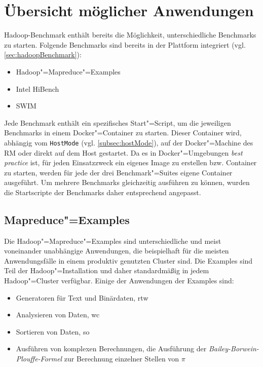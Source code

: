 \section{Übersicht möglicher Anwendungen}
\label{sec:appOverview}

Hadoop-Benchmark enthält bereits die Möglichkeit, unterschiedliche Benchmarks zu starten.
Folgende Benchmarks sind bereits in der Plattform integriert (vgl. \cref{sec:hadoopBenchmark}):

\begin{itemize}
    \item Hadoop"=Mapreduce"=Examples
    \item Intel HiBench
    \item \acrfull{SWIM}
\end{itemize}

Jede Benchmark enthält ein spezifisches Start"=Script, um die jeweiligen Benchmarks in einem Docker"=Container zu starten.
Dieser Container wird, abhängig vom \texttt{HostMode} (vgl. \cref{subsec:hostMode}), auf der Docker"=Machine des \gls{RM} oder direkt auf dem Host gestartet.
Da es in Docker"=Umgebungen \emph{best practice} ist, für jeden Einsatzzweck ein eigenes Image zu erstellen bzw. Container zu starten, werden für jede der drei Benchmark"=Suites eigene Container ausgeführt.
Um mehrere Benchmarks gleichzeitig ausführen zu können, wurden die Startscripte der Benchmarks daher entsprechend angepasst.

\subsection{Mapreduce"=Examples}
\label{subsec:mapreduceExamples}

Die Hadoop"=Mapreduce"=Examples sind unterschiedliche und meist voneinander unabhängige Anwendungen, die beispielhaft für die meisten Anwendungsfälle in einem produktiv genutzten Cluster sind.
Die Examples sind Teil der Hadoop"=Installation und daher standardmäßig in jedem Hadoop"=Cluster verfügbar.
Einige der Anwendungen der Examples sind:

\begin{itemize}
    \item Generatoren für Text und Binärdaten, \zB \acrlong{rtw}
    \item Analysieren von Daten, \zB \acrlong{wc}
    \item Sortieren von Daten, \zB \acrlong{so}
    \item Ausführen von komplexen Berechnungen, \zB die Ausführung der \emph{Bailey-Borwein-Plouffe-Formel} \cite{Bailey1997} zur Berechnung einzelner Stellen von $\pi$
\end{itemize}

